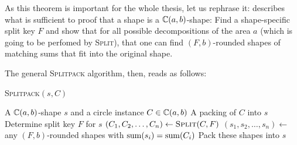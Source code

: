 As this theorem is important for the whole thesis, let us rephrase it:  describes what is sufficient to proof that a shape is a $\mathbb{C}(a,b)$-shape: Find a shape-specific split key $F$ and show that for all possible decompositions of the area $a$ (which is going to be perfomed by \textsc{Split}), that one can find $(F,b)$-rounded shapes of matching sums that fit into the original shape.

The general \textsc{Splitpack} algorithm, then, reads as follows:

\begin{algorithm}[htbp!]
    \caption{\textsc{Splitpack}$(s,C)$}
    \begin{algorithmic}
        \Require A $\mathbb{C}(a,b)$-shape $s$ and a circle instance $C \in \mathbb{C}(a,b)$
        \Ensure A packing of $C$ into $s$
        \State Determine split key $F$ for $s$
        \State $(C_1, C_2, \dots, C_n) \gets \textsc{Split}(C,F)$
        \State $(s_1, s_2, \dots, s_n) \gets$ any $(F,b)$-rounded shapes with $\operatorname{sum}(s_i) = \operatorname{sum}(C_i)$
        \State Pack these shapes into $s$
            \State {}
        \EndFor
    \end{algorithmic}
\end{algorithm}

%
%


